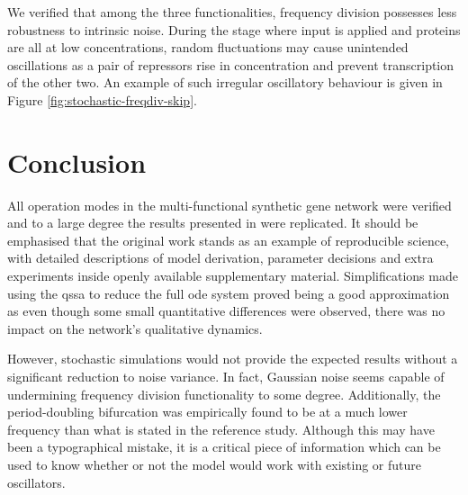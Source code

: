     We verified that among the three functionalities, frequency division possesses less robustness to intrinsic noise.
    During the stage where input is applied and proteins are all at low concentrations, random fluctuations may cause unintended oscillations as a pair of repressors rise in concentration and prevent transcription of the other two.
    An example of such irregular oscillatory behaviour is given in Figure \ref{fig:stochastic-freqdiv-skip}.





\section{Conclusion}

  All operation modes in the multi-functional synthetic gene network were verified and to a large degree the results presented in \cite{multif} were replicated.
  It should be emphasised that the original work stands as an example of reproducible science, with detailed descriptions of model derivation, parameter decisions and extra experiments inside openly available supplementary material.
  Simplifications made using the \ac{qssa} to reduce the full \ac{ode} system proved being a good approximation as even though some small quantitative differences were observed, there was no impact on the network's qualitative dynamics.

  However, stochastic simulations would not provide the expected results without a significant reduction to noise variance.
  In fact, Gaussian noise seems capable of undermining frequency division functionality to some degree.
  Additionally, the period-doubling bifurcation was empirically found to be at a much lower frequency than what is stated in the reference study.
  Although this may have been a typographical mistake, it is a critical piece of information which can be used to know whether or not the model would work with existing or future oscillators.

